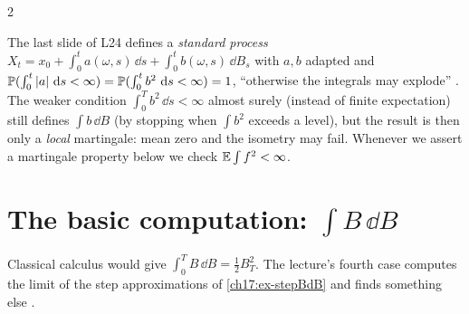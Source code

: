 \begin{paracol}{2}
\begin{remark}\label{ch17:rem-local}
The last slide of L24 defines a \emph{standard process} $X_t=x_0+\int_0^ta(\omega,s)\,\dd s+\int_0^tb(\omega,s)\,\dd B_s$ with $a,b$ adapted and
$\mathbb{P}(\int_0^t|a|\,\,\mathrm{d} s<\infty)=\mathbb{P}(\int_0^tb^2\,\,\mathrm{d} s<\infty)=1$, ``otherwise the integrals may explode'' . The weaker condition
$\int_0^Tb^2\,\dd s<\infty$ almost surely (instead of finite expectation) still defines $\int b\,\dd B$ (by stopping when $\int b^2$ exceeds a level), but the result is then only a
\emph{local} martingale: mean zero and the isometry may fail. Whenever we assert a martingale property below we check $\mathbb{E}\int f^2<\infty$.
\end{remark}

\section{The basic computation: $\int B\,\dd B$}\label{ch17:sec-BdB}

Classical calculus would give $\int_0^TB\,\dd B=\tfrac12B_T^2$. The lecture's fourth case computes the limit of the step approximations of
\cref{ch17:ex-stepBdB} and finds something else .


\end{paracol}
